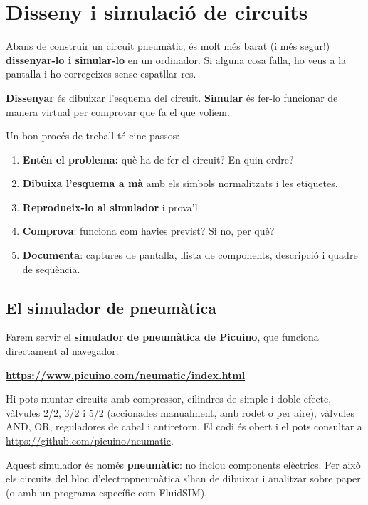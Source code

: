 \section{Disseny i simulació de circuits}

Abans de construir un circuit pneumàtic, és molt més barat (i més segur!) \textbf{dissenyar-lo i simular-lo} en un ordinador. Si alguna cosa falla, ho veus a la pantalla i ho corregeixes sense espatllar res.

\begin{idea}
\textbf{Dissenyar} és dibuixar l'esquema del circuit. \textbf{Simular} és fer-lo funcionar de manera virtual per comprovar que fa el que volíem.

Un bon procés de treball té cinc passos:
\begin{enumerate}
 \item \textbf{Entén el problema:} què ha de fer el circuit? En quin ordre?
 \item \textbf{Dibuixa l'esquema a mà} amb els símbols normalitzats i les etiquetes.
 \item \textbf{Reprodueix-lo al simulador} i prova'l.
 \item \textbf{Comprova}: funciona com havies previst? Si no, per què?
 \item \textbf{Documenta}: captures de pantalla, llista de components, descripció i quadre de seqüència.
\end{enumerate}
\end{idea}

\subsection*{El simulador de pneumàtica}

Farem servir el \textbf{simulador de pneumàtica de Picuino}, que funciona directament al navegador:
\begin{center}\textbf{\url{https://www.picuino.com/neumatic/index.html}}\end{center}
Hi pots muntar circuits amb compressor, cilindres de simple i doble efecte, vàlvules 2/2, 3/2 i 5/2 (accionades manualment, amb rodet o per aire), vàlvules AND, OR, reguladores de cabal i antiretorn. El codi és obert i el pots consultar a \url{https://github.com/picuino/neumatic}.

\begin{atencio}
Aquest simulador és només \textbf{pneumàtic}: no inclou components elèctrics. Per això els circuits del bloc d'electropneumàtica s'han de dibuixar i analitzar sobre paper (o amb un programa específic com FluidSIM).
\end{atencio}

